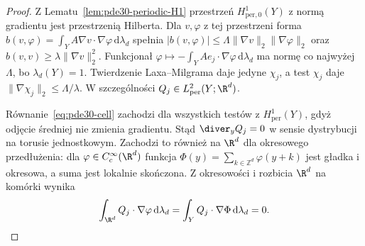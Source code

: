 \begin{proof}
Z Lematu~\ref{lem:pde30-periodic-H1}
przestrzeń $H^1_{\mathrm{per},0}(Y)$ z normą
gradientu jest przestrzenią Hilberta.
Dla $v,\varphi$ z tej przestrzeni forma
$b(v,\varphi)=\int_Y A\nabla v\cdot\nabla\varphi\,
\mathrm d\lambda_d$ spełnia
$|b(v,\varphi)|\le\Lambda\|\nabla v\|_2\|\nabla\varphi\|_2$
oraz $b(v,v)\ge\lambda\|\nabla v\|_2^2$.
Funkcjonał
$\varphi\mapsto-\int_YAe_j\cdot\nabla\varphi\,
\mathrm d\lambda_d$ ma normę co najwyżej $\Lambda$,
bo $\lambda_d(Y)=1$. Twierdzenie Laxa--Milgrama
daje jedyne $\chi_j$, a test $\chi_j$ daje
$\|\nabla\chi_j\|_2\le\Lambda/\lambda$.
W szczególności $Q_j\in L^2_{\mathrm{per}}(Y;\R^d)$.

Równanie~\eqref{eq:pde30-cell} zachodzi dla wszystkich
testów z $H^1_{\mathrm{per}}(Y)$, gdyż odjęcie średniej
nie zmienia gradientu. Stąd $\diver_yQ_j=0$
w sensie dystrybucji na torusie jednostkowym.
Zachodzi to również na $\R^d$ dla okresowego
przedłużenia: dla $\varphi\in C_c^\infty(\R^d)$
funkcja $\Phi(y)=\sum_{k\in\mathbb Z^d}\varphi(y+k)$
jest gładka i okresowa, a suma jest lokalnie skończona.
Z okresowości i rozbicia $\R^d$ na komórki wynika
\[
 \int_{\R^d}Q_j\cdot\nabla\varphi\,\mathrm d\lambda_d
 =\int_YQ_j\cdot\nabla\Phi\,\mathrm d\lambda_d=0.
\]


\end{proof}

